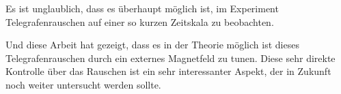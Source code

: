 \documentclass[main.tex]{subfiles}
\begin{document}
Es ist unglaublich, dass es überhaupt möglich ist, im Experiment Telegrafenrauschen auf einer so kurzen Zeitskala zu beobachten. 

Und diese Arbeit hat gezeigt, dass es in der Theorie möglich ist dieses Telegrafenrauschen durch ein externes Magnetfeld zu tunen. Diese sehr direkte Kontrolle über das Rauschen ist ein sehr interessanter Aspekt, der in Zukunft noch weiter untersucht werden sollte.
\end{document}
